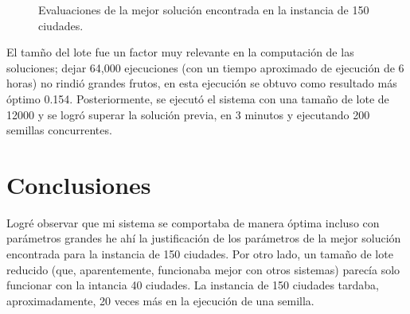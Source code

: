 \documentclass[a4paper]{report}
\begin{document}
\begin{figure}[h!tbp]
  \hspace*{-1.6cm}
  
  \caption{Evaluaciones de la mejor soluci\'on encontrada en la instancia de 150 ciudades.}
\end{figure}

El tam\~no del lote fue un factor muy relevante en la computaci\'on de las soluciones; dejar
64,000 ejecuciones (con un tiempo aproximado de ejecuci\'on de 6 horas) no rindi\'o grandes
frutos, en esta ejecuci\'on se obtuvo como resultado m\'as \'optimo 0.154. Posteriormente,
se ejecut\'o el sistema con una tama\~no de lote de 12000 y se logr\'o superar la soluci\'on
previa, en 3 minutos y ejecutando 200 semillas concurrentes.

\chapter{Conclusiones}

Logr\'e observar que mi sistema se comportaba de manera \'optima incluso con par\'ametros
grandes he ah\'i la justificaci\'on de los par\'ametros de la mejor soluci\'on encontrada
para la instancia de 150 ciudades. Por otro lado, un tama\~no de lote reducido (que,
aparentemente, funcionaba mejor con otros sistemas) parec\'ia solo funcionar con la intancia
40 ciudades. La instancia de 150 ciudades tardaba, aproximadamente, 20 veces m\'as en la ejecuci\'on
de una semilla.



{}

\end{document}
